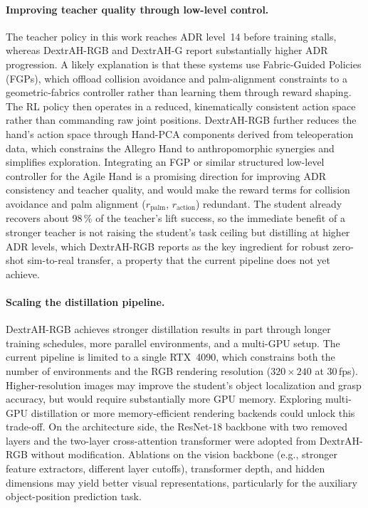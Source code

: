 \paragraph{Improving teacher quality through low-level control.}
The teacher policy in this work reaches ADR level~14 before training stalls, whereas DextrAH-RGB and DextrAH-G report substantially higher ADR progression.
A likely explanation is that these systems use Fabric-Guided Policies (FGPs), which offload collision avoidance and palm-alignment constraints to a geometric-fabrics controller rather than learning them through reward shaping.
The RL policy then operates in a reduced, kinematically consistent action space rather than commanding raw joint positions.
DextrAH-RGB further reduces the hand's action space through Hand-PCA components derived from teleoperation data, which constrains the Allegro Hand to anthropomorphic synergies and simplifies exploration.
Integrating an FGP or similar structured low-level controller for the Agile Hand is a promising direction for improving ADR consistency and teacher quality, and would make the reward terms for collision avoidance and palm alignment ($r_{\text{palm}}$, $r_{\text{action}}$) redundant.
The student already recovers about 98\,\% of the teacher's lift success, so the immediate benefit of a stronger teacher is not raising the student's task ceiling but distilling at higher ADR levels, which DextrAH-RGB reports as the key ingredient for robust zero-shot sim-to-real transfer, a property that the current pipeline does not yet achieve.

\paragraph{Scaling the distillation pipeline.}
DextrAH-RGB achieves stronger distillation results in part through longer training schedules, more parallel environments, and a multi-GPU setup.
The current pipeline is limited to a single RTX~4090, which constrains both the number of environments and the RGB rendering resolution ($320 \times 240$ at 30\,fps).
Higher-resolution images may improve the student's object localization and grasp accuracy, but would require substantially more GPU memory.
Exploring multi-GPU distillation or more memory-efficient rendering backends could unlock this trade-off.
On the architecture side, the ResNet-18 backbone with two removed layers and the two-layer cross-attention transformer were adopted from DextrAH-RGB without modification.
Ablations on the vision backbone (e.g., stronger feature extractors, different layer cutoffs), transformer depth, and hidden dimensions may yield better visual representations, particularly for the auxiliary object-position prediction task.

